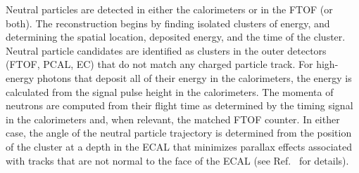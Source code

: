 \documentclass[final,3p,twocolumn]{elsarticle}
\begin{document}
Neutral particles are detected in either the calorimeters or in the FTOF (or both). The reconstruction begins by
finding isolated clusters of energy, and determining the spatial location, deposited energy, and the time of the
cluster. Neutral particle candidates are identified as clusters in the outer detectors (FTOF, PCAL, EC) that do
not match any charged particle track. For high-energy photons that deposit all of their energy in the calorimeters,
the energy is calculated from the signal pulse height in the calorimeters. The momenta of neutrons are computed
from their flight time as determined by the timing signal in the calorimeters and, when relevant, the matched
FTOF counter. In either case, the angle of the neutral particle trajectory is determined from the position of the
cluster at a depth in the ECAL that minimizes parallax effects associated with tracks that are not normal to the
face of the ECAL (see Ref.~\cite{ECAL} for details).
\end{document}

